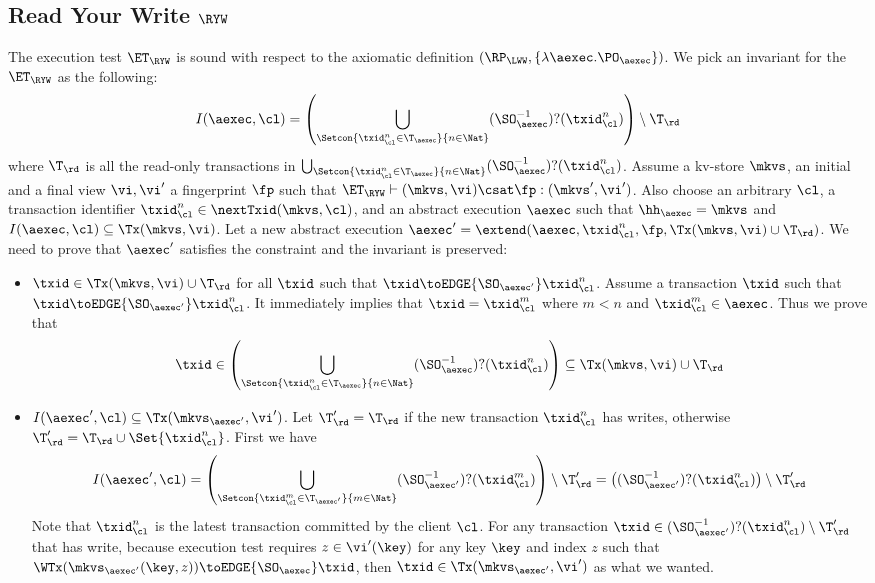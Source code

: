 \subsection{Read Your Write \( \RYW \) }

\label{sec:sound-complete-ryw}

The execution test $\ET_\RYW$ is sound with respect to the axiomatic definition 
$(\RP_{\LWW}, \{\lambda \aexec. \PO_{\aexec} \})$.
We pick an invariant for the \( \ET_\RYW \) as the following:
\[
    I(\aexec, \cl) = \left( \bigcup_{\Setcon{\txid_{\cl}^{n} \in \T_{\aexec} }{ n \in \Nat }} (\SO_{\aexec}^{-1})?(\txid^n_\cl) \right) \setminus \T_\rd
\]
where \( \T_\rd \) is all the read-only transactions in \( \bigcup_{\Setcon{\txid_{\cl}^{n} \in \T_{\aexec} }{ n \in \Nat }} (\SO_{\aexec}^{-1})?(\txid^n_\cl) \).
Assume a kv-store $\mkvs$, an initial and a final view $\vi, \vi'$  a fingerprint $\fp$ 
such that $\ET_{\RYW} \vdash (\mkvs, \vi) \csat \fp: (\mkvs',\vi')$. 
Also choose an arbitrary $\cl$, a transaction identifier $\txid_\cl^n \in \nextTxid(\mkvs, \cl)$, 
and an abstract execution $\aexec$ such that $\hh_{\aexec} = \mkvs$ and 
\( I(\aexec, \cl) \subseteq \Tx(\mkvs, \vi) \).
Let a new abstract execution \( \aexec' = \extend(\aexec, \txid_\cl^n, \fp, \Tx(\mkvs, \vi) \cup \T_\rd) \).
We need to prove that \( \aexec' \) satisfies the constraint and the invariant is preserved:
\begin{itemize}
    \item \( \txid \in \Tx(\mkvs, \vi) \cup \T_\rd  \) for all \( \txid \) such that \( \txid \toEDGE{\SO_{\aexec'}} \txid_\cl^n  \). 
    Assume a transaction \( \txid \) such that \( \txid \toEDGE{\SO_{\aexec'}} \txid_\cl^n \).
It immediately implies that \( \txid = \txid_\cl^m\) where \( m < n \) and \( \txid_\cl^m \in \aexec \).
Thus we prove that 
\[ 
    \txid \in \left( \bigcup_{\Setcon{\txid_{\cl}^{n} \in \T_{\aexec} }{ n \in \Nat}} (\SO_{\aexec}^{-1})?(\txid^n_\cl) \right) \subseteq \Tx(\mkvs,\vi) \cup \T_\rd
\]
\item \(I(\aexec',\cl) \subseteq \Tx(\mkvs_{\aexec'}, \vi') \).
Let \( \T'_\rd = \T_\rd \) if the new transaction \( \txid_\cl^n\) has writes, otherwise \( \T'_\rd = \T_\rd \cup \Set{\txid_\cl^n}\).
First we have
\[ I(\aexec', \cl) = \left(\bigcup_{\Setcon{\txid_{\cl}^{m} \in \T_{\aexec'} }{ m \in \Nat }} (\SO_{\aexec'}^{-1})?(\txid^m_\cl) \right) \setminus \T'_{\rd} = \left( (\SO_{\aexec'}^{-1})?(\txid^n_\cl) \right) \setminus \T'_\rd 
\]
Note that \( \txid^n_\cl \) is the latest transaction committed by the client \( \cl \).
For any transaction \( \txid \in (\SO_{\aexec'}^{-1})?(\txid^n_\cl) \setminus \T'_\rd \) that has write,
because execution test requires \( z \in \vi'(\key) \) for any key \( \key \) and index \( z \) such that \( \WTx( \mkvs_{\aexec'}(\key, z) ) \toEDGE{\SO_\aexec} \txid \),
then \( \txid \in \Tx(\mkvs_{\aexec'}, \vi') \) as what we wanted.
\end{itemize}

